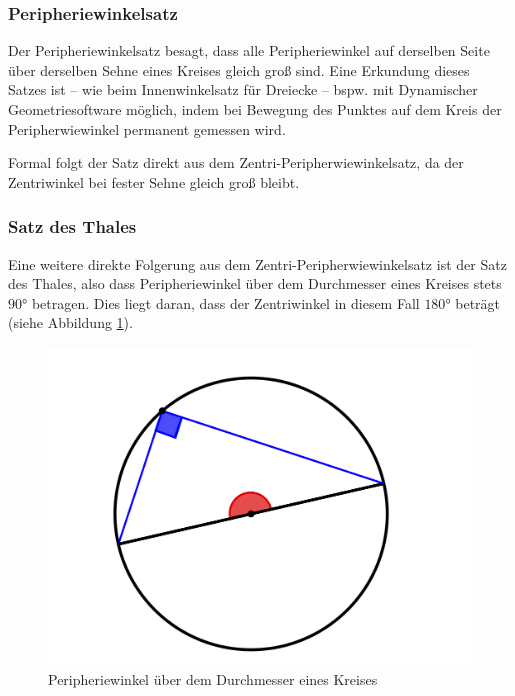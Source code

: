 \documentclass[
]{scrbook}
\theoremstyle{definition}
\theoremstyle{definition}
\theoremstyle{definition}
\theoremstyle{definition}
\theoremstyle{remark}
\begin{document}
\hypertarget{peripheriewinkelsatz}{%
\subsubsection{Peripheriewinkelsatz}\label{peripheriewinkelsatz}}

Der Peripheriewinkelsatz besagt, dass alle Peripheriewinkel auf derselben Seite über derselben Sehne eines Kreises gleich groß sind. Eine Erkundung dieses Satzes ist -- wie beim Innenwinkelsatz für Dreiecke -- bspw. mit Dynamischer Geometriesoftware möglich, indem bei Bewegung des Punktes auf dem Kreis der Peripherwiewinkel permanent gemessen wird.

Formal folgt der Satz direkt aus dem Zentri-Peripherwiewinkelsatz, da der Zentriwinkel bei fester Sehne gleich groß bleibt.

\hypertarget{satz-des-thales}{%
\subsubsection{Satz des Thales}\label{satz-des-thales}}

Eine weitere direkte Folgerung aus dem Zentri-Peripherwiewinkelsatz ist der Satz des Thales, also dass Peripheriewinkel über dem Durchmesser eines Kreises stets \(90°\) betragen. Dies liegt daran, dass der Zentriwinkel in diesem Fall \(180°\) beträgt (siehe Abbildung \ref{fig:Thales}).

\begin{figure}

{\centering \includegraphics[width=0.75\linewidth]{pictures/12-Thales} 

}

\caption{Peripheriewinkel über dem Durchmesser eines Kreises}\label{fig:Thales}
\end{figure}
\end{document}
